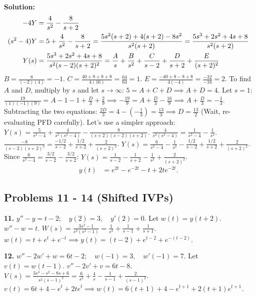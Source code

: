 \documentclass[11pt, letterpaper]{article}
\theoremstyle{definition}
\theoremstyle{remark}
\begin{document}
\textbf{Solution:}
\begin{align*}
[s^2 Y - 5] - 4Y &= \frac{4}{s^2} - \frac{8}{s + 2} \\ \relax
(s^2 - 4)Y &= 5 + \frac{4}{s^2} - \frac{8}{s + 2} = \frac{5s^2(s + 2) + 4(s + 2) - 8s^2}{s^2(s + 2)} = \frac{5s^3 + 2s^2 + 4s + 8}{s^2(s + 2)} \\ \relax
Y(s) &= \frac{5s^3 + 2s^2 + 4s + 8}{s^2(s - 2)(s + 2)^2} = \frac{A}{s} + \frac{B}{s^2} + \frac{C}{s - 2} + \frac{D}{s + 2} + \frac{E}{(s + 2)^2}
\end{align*}
$B = \frac{8}{(-2)(4)} = -1$.
$C = \frac{40 + 8 + 8 + 8}{4(16)} = \frac{64}{64} = 1$.
$E = \frac{-40 + 8 - 8 + 8}{4(-4)} = \frac{-32}{-16} = 2$.
To find $A$ and $D$, multiply by $s$ and let $s \to \infty$: $5 = A + C + D \implies A + D = 4$.
Let $s=1$: $\frac{19}{(1)(-1)(9)} = A - 1 - 1 + \frac{D}{3} + \frac{2}{9} \implies -\frac{19}{9} = A + \frac{D}{3} - \frac{16}{9} \implies A + \frac{D}{3} = -\frac{1}{3}$.
Subtracting the two equations: $\frac{2D}{3} = 4 - (-\frac{1}{3}) = \frac{13}{3} \implies D = \frac{13}{2}$ (Wait, re-evaluating PFD carefully).
Let's use a simpler approach: $Y(s) = \frac{5}{s^2 - 4} + \frac{4}{s^2(s^2 - 4)} - \frac{8}{(s + 2)(s - 2)(s + 2)}$.
$\frac{4}{s^2(s^2 - 4)} = \frac{1}{s^2 - 4} - \frac{1}{s^2}$.
$\frac{-8}{(s - 2)(s + 2)^2} = \frac{-1/2}{s - 2} + \frac{1/2}{s + 2} + \frac{2}{(s + 2)^2}$.
$Y(s) = \frac{6}{s^2 - 4} - \frac{1}{s^2} - \frac{1/2}{s - 2} + \frac{1/2}{s + 2} + \frac{2}{(s + 2)^2}$.
Since $\frac{6}{s^2 - 4} = \frac{3/2}{s - 2} - \frac{3/2}{s + 2}$:
$Y(s) = \frac{1}{s - 2} - \frac{1}{s + 2} - \frac{1}{s^2} + \frac{2}{(s + 2)^2}$.
\begin{align*}
y(t) &= e^{2t} - e^{-2t} - t + 2te^{-2t}.
\end{align*}

\subsection*{Problems 11 - 14 (Shifted IVPs)}
\textbf{11.} $y'' - y = t - 2 ; \quad y(2) = 3 , \quad y'(2) = 0$. Let $w(t) = y(t+2)$. $w'' - w = t$. $W(s) = \frac{3s^2 - 1}{s^2(s^2 - 1)} = \frac{1}{s^2} + \frac{1}{s - 1} + \frac{1}{s + 1}$. $w(t) = t + e^t + e^{-t} \implies y(t) = (t - 2) + e^{t - 2} + e^{-(t - 2)}$.

\textbf{12.} $w'' - 2w' + w = 6t - 2 ; \quad w(-1) = 3 , \quad w'(-1) = 7$. Let $v(t) = w(t-1)$. $v'' - 2v' + v = 6t - 8$. $V(s) = \frac{3s^3 - s^2 - 8s + 6}{s^2(s - 1)^2} = \frac{6}{s^2} + \frac{4}{s} - \frac{1}{s - 1} + \frac{2}{(s - 1)^2}$. $v(t) = 6t + 4 - e^t + 2te^t \implies w(t) = 6(t + 1) + 4 - e^{t + 1} + 2(t + 1)e^{t + 1}$.
\end{document}
